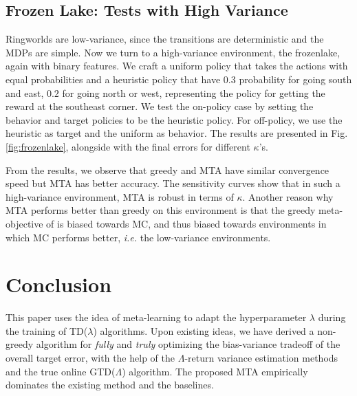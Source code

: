 \documentclass{article}
\newcommand\ie{\textit{i.e.}}
\begin{document}
\subsection{Frozen Lake: Tests with High Variance}
Ringworlds are low-variance, since the transitions are deterministic and the MDPs are simple. Now we turn to a high-variance environment, the frozenlake, again with binary features. We craft a uniform policy that takes the actions with equal probabilities and a heuristic policy that have $0.3$ probability for going south and east, $0.2$ for going north or west, representing the policy for getting the reward at the southeast corner. We test the on-policy case by setting the behavior and target policies to be the heuristic policy. For off-policy, we use the heuristic as target and the uniform as behavior. The results are presented in Fig. \ref{fig:frozenlake}, alongside with the final errors for different $\kappa$'s.
\par
From the results, we observe that greedy and MTA have similar convergence speed but MTA has better accuracy. The sensitivity curves show that in such a high-variance environment, MTA is robust in terms of $\kappa$. Another reason why MTA performs better than greedy on this environment is that the greedy meta-objective of \cite{white2016greedy} is biased towards MC, and thus biased towards environments in which MC performs better, \ie{} the low-variance environments.
\par

\section{Conclusion}
This paper uses the idea of meta-learning to adapt the hyperparameter $\lambda$ during the training of TD($\lambda$) algorithms. Upon existing ideas, we have derived a non-greedy algorithm for \textit{fully} and \textit{truly} optimizing the bias-variance tradeoff of the overall target error, with the help of the $\Lambda$-return variance estimation methods and the true online GTD($\Lambda$) algorithm. The proposed MTA empirically dominates the existing method and the baselines.

\end{document}
